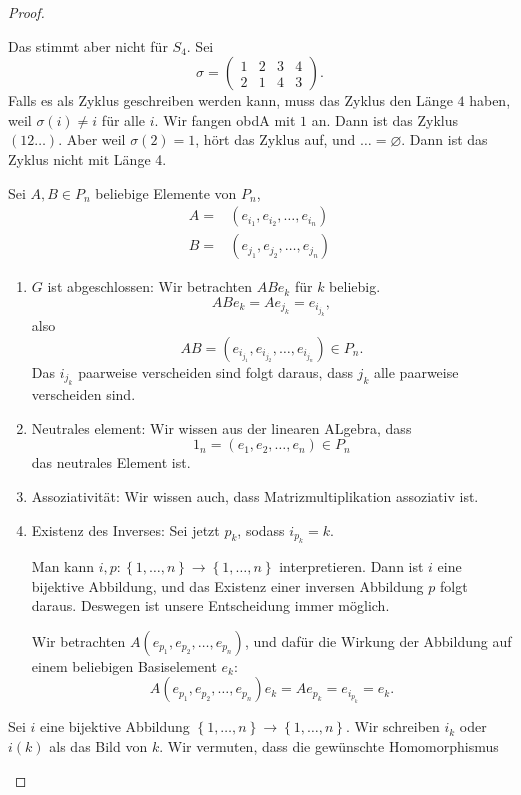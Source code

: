 \begin{proof}
\begin{parts}
		Das stimmt aber nicht f\"{u}r $S_4$. Sei
		\[
			\sigma=\begin{pmatrix} 1 & 2 & 3 & 4\\ 2 & 1 & 4 & 3 \end{pmatrix} 
		.\] 
		Falls es als Zyklus geschreiben werden kann, muss das Zyklus den Länge $4$ haben, weil $\sigma(i)\neq i$ f\"{u}r alle $i$. Wir fangen obdA mit $1$ an. Dann ist das Zyklus $(12\dots)$. Aber weil $\sigma(2)=1$, hört das Zyklus auf, und $\dots=\varnothing$. Dann ist das Zyklus nicht mit Länge 4. 
	\item Sei $A,B\in P_n$ beliebige Elemente von $P_n$,
		\begin{align*}
			A=&(e_{i_1},e_{i_2},\dots, e_{i_n})\\
			B=&(e_{j_1},e_{j_2},\dots, e_{j_n})
		\end{align*}
		\begin{enumerate}[label=(\roman*)]
			\item $G$ ist abgeschlossen: Wir betrachten $ABe_k$ f\"{u}r $k$ beliebig.
				\[
					ABe_k=Ae_{j_k}=e_{i_{j_k}}
				,\]
				also
				\[
					AB=(e_{i_{j_1}},e_{i_{j_2}},\dots,e_{i_{j_n}})\in P_n
				.\] 
				Das $i_{j_k}$ paarweise verscheiden sind folgt daraus, dass $j_k$ alle paarweise verscheiden sind.
			\item Neutrales element: Wir wissen aus der linearen ALgebra, dass
				 \[
				1_n=(e_1,e_2,\dots, e_n)\in P_n
				\]
				das neutrales Element ist.
			\item Assoziativität: Wir wissen auch, dass Matrizmultiplikation assoziativ ist.
			\item Existenz des Inverses: Sei jetzt $p_k$, sodass $i_{p_k}=k$. 
				\begin{tcolorbox}[title=Bemerkung]
					Man kann $i,p: \left\{ 1,\dots,n \right\} \to \left\{ 1,\dots,n \right\} $ interpretieren. Dann ist $i$ eine bijektive Abbildung, und das Existenz einer inversen Abbildung $p$ folgt daraus. Deswegen ist unsere Entscheidung immer möglich.
				\end{tcolorbox}
				Wir betrachten $A(e_{p_1},e_{p_2},\dots, e_{p_n})$, und dafür die Wirkung der Abbildung auf einem beliebigen Basiselement $e_k$: 
\[
	A(e_{p_1},e_{p_2},\dots,e_{p_n})e_k=Ae_{p_k}=e_{i_{p_k}}=e_k
.\] 
		\end{enumerate}
	\item Sei $i$ eine bijektive Abbildung $\left\{ 1,\dots,n \right\}\to \left\{ 1,\dots,n \right\} $. Wir schreiben $i_k$ oder $i(k)$ als das Bild von $k$. Wir vermuten, dass die gewünschte Homomorphismus

\end{parts}
\end{proof}
